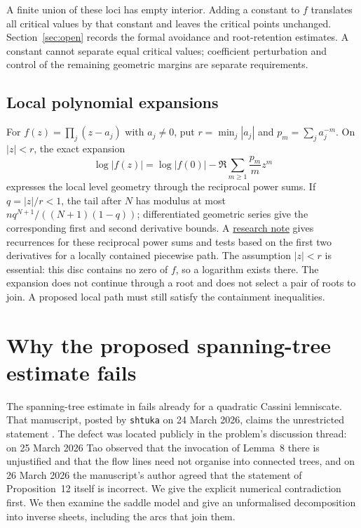 \documentclass[11pt]{article}
\begin{document}
\noindent A finite union of these loci has empty interior. Adding a constant to
$f$ translates all critical values by that constant and leaves the critical
points unchanged. Section~\ref{sec:open} records the formal avoidance and
root-retention estimates. A constant cannot separate equal critical values;
coefficient perturbation and control of the remaining geometric margins
are separate requirements.

\subsection*{Local polynomial expansions}\label{subsec:local-polynomial-expansions}

For $f(z)=\prod_j(z-a_j)$ with $a_j\ne0$, put $r=\min_j|a_j|$ and
$p_m=\sum_j a_j^{-m}$.  On $|z|<r$, the exact expansion
\[
 \log|f(z)|=\log|f(0)|-\Re\sum_{m\ge1}\frac{p_m}{m}z^m
\]
expresses the local level geometry through the reciprocal power sums.  If $q=|z|/r<1$,
the tail after $N$ has modulus at most
$nq^{N+1}/((N+1)(1-q))$; differentiated geometric series give the
corresponding first and second derivative bounds.
A \href{https://github.com/wcook04/plectis-erdos/blob/f36a98bf3d3e6f65f1074e3b800e3293d5b8a51a/ErdosProblems/Erdos1041/ReciprocalNewtonExpansion.md}{research note}
gives recurrences for these reciprocal power sums and tests based on the
first two derivatives for a locally contained piecewise path.
The assumption $|z|<r$ is essential: this disc contains no zero of $f$,
so a logarithm exists there. The expansion does not continue through a
root and does not select a pair of roots to join. A proposed local path
must still satisfy the containment inequalities.


\section{Why the proposed spanning-tree estimate fails}\label{sec:gap}

The spanning-tree estimate in \cite[Proposition~12]{march2026} fails
already for a quadratic Cassini lemniscate. That manuscript, posted by
\texttt{shtuka} on 24 March 2026, claims the unrestricted statement
\cite[Theorem~1, p.~1]{march2026}. The defect was located publicly in the
problem's discussion thread: on 25 March 2026 Tao observed that the
invocation of Lemma~8 there is unjustified and that the flow lines need not
organise into connected trees, and on 26 March 2026 the manuscript's author
agreed that the statement of Proposition~12 itself is incorrect. We give the
explicit numerical contradiction first. We then examine the saddle
model and give an unformalised decomposition into inverse sheets,
including the arcs that join them.
\end{document}
